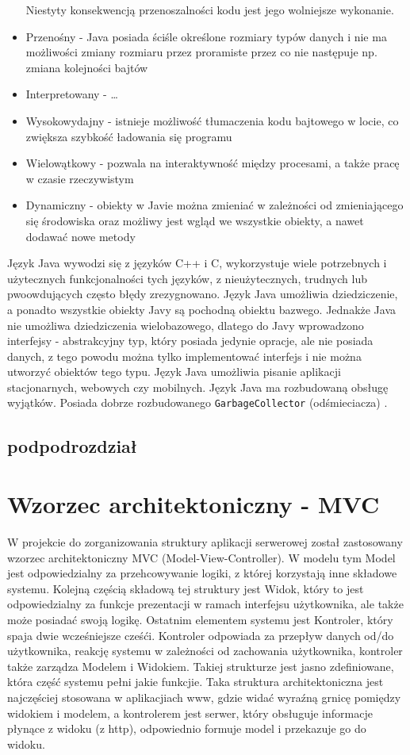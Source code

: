 \documentclass[eng,printmode,oneside]{mgr}
\begin{document}
\begin{itemize}
  Niestyty konsekwencją przenoszalności kodu jest jego wolniejsze wykonanie.
  \item Przenośny - Java posiada ściśle określone rozmiary typów danych i nie ma
  możliwości zmiany rozmiaru przez proramiste przez co nie następuje np. zmiana
  kolejności bajtów
  \item Interpretowany - \ldots
  \item Wysokowydajny - istnieje możliwość tłumaczenia kodu bajtowego w locie,
  co zwiększa szybkość ładowania się programu
  \item Wielowątkowy - pozwala na interaktywność między procesami, a także pracę
  w czasie rzeczywistym
  \item Dynamiczny - obiekty w Javie można zmieniać w zależności od
  zmieniającego się środowiska oraz możliwy jest wgląd we wszystkie obiekty, a
  nawet dodawać nowe metody
\end{itemize}

Język Java wywodzi się z języków C++ i C, wykorzystuje wiele potrzebnych i
użytecznych funkcjonalności tych języków, z nieużytecznych, trudnych lub
pwoowdujących często błędy zrezygnowano. Język Java umożliwia dziedziczenie, a
ponadto wszystkie obiekty Javy są pochodną obiektu bazwego. Jednakże Java nie
umożliwa dziedziczenia wielobazowego, dlatego do Javy wprowadzono interfejsy -
abstrakcyjny typ, który posiada jedynie opracje, ale nie posiada danych, z tego
powodu można tylko implementować interfejs i nie można utworzyć obiektów tego
typu. Język Java umożliwia pisanie aplikacji stacjonarnych, webowych czy
mobilnych. Język Java ma rozbudowaną obsługę wyjątków. Posiada dobrze
rozbudowanego \texttt{GarbageCollector} (odśmieciacza) \cite{java.doc}.
\subsection{podpodrozdział}

\section{Wzorzec architektoniczny - MVC}

W projekcie do zorganizowania struktury aplikacji serwerowej został zastosowany
wzorzec architektoniczny MVC (Model-View-Controller). W modelu tym Model jest
odpowiedzialny za przehcowywanie logiki, z której korzystają inne składowe
systemu. Kolejną częścią składową tej struktury jest Widok, który to jest
odpowiedzialny za funkcje prezentacji w ramach interfejsu użytkownika, ale
także może posiadać swoją logikę. Ostatnim elementem systemu jest Kontroler,
który spaja dwie wcześniejsze cześći. Kontroler odpowiada za przepływ danych
od/do użytkownika, reakcję systemu w zależności od zachowania użytkownika,
kontroler także zarządza Modelem i Widokiem. Takiej strukturze jest jasno
zdefiniowane, która część systemu pełni jakie funkcjie. Taka struktura
architektoniczna jest najczęściej stosowana w aplikacjiach www, gdzie widać
wyraźną grnicę pomiędzy widokiem i modelem, a kontrolerem jest serwer, który
obsługuje informacje płynące z widoku (z http), odpowiednio formuje model i
przekazuje go do widoku. \cite{java.mvc}
\end{document}
